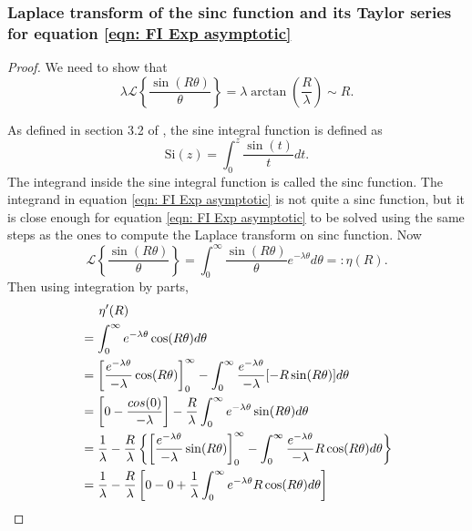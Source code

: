 \documentclass[%
 reprint,
 amsmath,amssymb,
 aps,
]{revtex4-2}
\begin{document}
\subsubsection{Laplace transform of the sinc function and its Taylor series for equation \eqref{eqn: FI Exp asymptotic}}
\begin{proof}
We need to show that
\begin{equation*}
    \lambda \mathcal{L}\left\{\frac{\sin(R\theta)}{\theta} \right\} = \lambda \arctan\left(\frac{R}{\lambda}\right) \sim R.
\end{equation*}

As defined in section 3.2 of \cite{rotiroti2022computing}, the sine integral function is defined as
\begin{equation*}
    \text{Si}(z) = \int_0^z \frac{\sin(t)}{t} dt.
\end{equation*}
The integrand inside the sine integral function is called the sinc function. The integrand in equation \eqref{eqn: FI Exp asymptotic} is not quite a sinc function, but it is close enough for equation \eqref{eqn: FI Exp asymptotic} to be solved using the same steps as the ones to compute the Laplace transform on sinc function. Now
\begin{equation} \label{eqn: Laplace transform eta function}
    \mathcal{L}\left\{\frac{\sin(R\theta)}{\theta}\right\} = \int_0^\infty \frac{\sin(R\theta)}{\theta} e^{-\lambda \theta} d\theta =: \eta(R).
\end{equation}
Then using integration by parts,
\begin{align*}
    & \hspace{0.5cm} \eta'(R) \\
    & = \int_0^\infty e^{-\lambda \theta} \cos(R\theta) d\theta\\
    & = \left[\frac{e^{-\lambda\theta}}{-\lambda}\cos(R\theta) \right]_0^\infty - \int_0^\infty \frac{e^{-\lambda\theta}}{-\lambda}[-R\sin(R\theta)]d\theta \\
    & = \left[0-\frac{cos(0)}{-\lambda} \right] - \frac{R}{\lambda}\int_0^\infty e^{-\lambda\theta}\sin(R\theta)d\theta\\
    & = \frac{1}{\lambda} - \frac{R}{\lambda}\left\{\left[\frac{e^{-\lambda\theta}}{-\lambda}\sin(R\theta) \right]_0^\infty - \int_0^\infty \frac{e^{-\lambda\theta}}{-\lambda}R\cos(R\theta)d\theta \right\}\\
    & = \frac{1}{\lambda} - \frac{R}{\lambda}\left[0 - 0 + \frac{1}{\lambda}\int_0^\infty e^{-\lambda\theta}R\cos(R\theta) d\theta \right] \\

\end{align*}
\end{proof}
\end{document}

